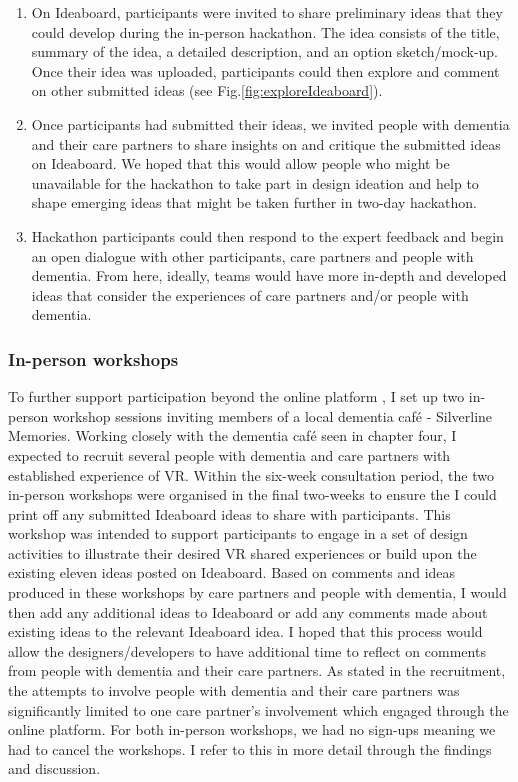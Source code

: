 \begin{enumerate}
    \item On Ideaboard, participants were invited to share preliminary ideas that they could develop during the in-person hackathon. The idea consists of the title, summary of the idea, a detailed description, and an option sketch/mock-up. Once their idea was uploaded, participants could then explore and comment on other submitted ideas  (see Fig.\ref{fig:exploreIdeaboard}).
    
    \item Once participants had submitted their ideas, we invited people with dementia and their care partners to share insights on and critique the submitted ideas on Ideaboard. We hoped that this would allow people who might be unavailable for the hackathon to take part in design ideation and help to shape emerging ideas that might be taken further in two-day hackathon. 
    
    \item Hackathon participants could then respond to the expert feedback and begin an open dialogue with other participants, care partners and people with dementia. From here, ideally, teams would have more in-depth and developed ideas that consider the experiences of care partners and/or people with dementia. 
\end{enumerate}


\subsubsection{In-person workshops}
\label{sec:in-personWorkshops}

To further support participation beyond the online platform \citep{piper2016technological}, I set up two in-person workshop sessions inviting members of a local dementia café - Silverline Memories. Working closely with the dementia café seen in chapter four, I expected to recruit several people with dementia and care partners with established experience of VR. Within the six-week consultation period, the two in-person workshops were organised in the final two-weeks to ensure the I could print off any submitted Ideaboard ideas to share with participants.  This workshop was intended to support participants to engage in a set of design activities to illustrate their desired VR shared experiences or build upon the existing eleven ideas posted on Ideaboard. Based on comments and ideas produced in these workshops by care partners and people with dementia, I would then add any additional ideas to Ideaboard or add any comments made about existing ideas to the relevant Ideaboard idea. I hoped that this process would allow the designers/developers to have additional time to reflect on comments from people with dementia and their care partners. As stated in the recruitment, the attempts to involve people with dementia and their care partners was significantly limited to one care partner’s involvement which engaged through the online platform. For both in-person workshops, we had no sign-ups meaning we had to cancel the workshops. I refer to this in more detail through the findings and discussion.


